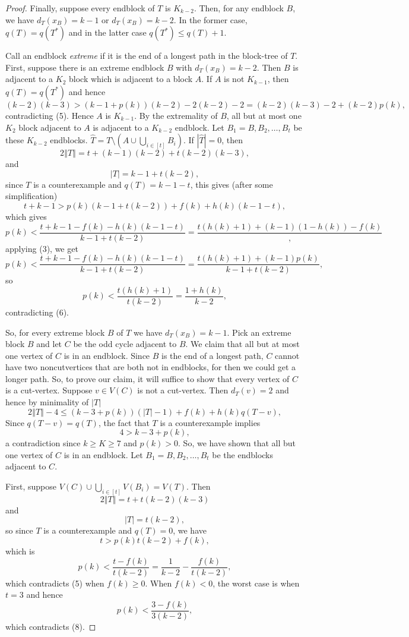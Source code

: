 \documentclass[12pt]{article}
\theoremstyle{plain}
\theoremstyle{definition}
\theoremstyle{remark}
\newcommand{\card}[1]{\left|#1\right|}
\newcommand{\size}[1]{\left\Vert#1\right\Vert}
\newcommand{\irange}[1]{\left[#1\right]}
\newcommand{\parens}[1]{\left( #1 \right)}
\begin{document}
\begin{proof}
		 Finally, suppose every endblock of $T$ is $K_{k-2}$.  Then, for any endblock $B$, we have $d_T(x_B) = k - 1$ or $d_T(x_B) = k-2$.  In the former case, $q(T) = q(T^*)$ and in the latter case $q(T^*) \le q(T) + 1$.  
		 
		 Call an endblock \emph{extreme} if it is the end of a longest path in the block-tree of $T$.  First, suppose there is an extreme endblock $B$ with $d_T(x_B) = k-2$.  Then $B$ is adjacent to a $K_2$ block which is adjacent to a block $A$.
		 If $A$ is not $K_{k-1}$, then $q(T) = q(T^*)$ and hence
		 \[(k-2)(k-3) > (k-1 + p(k))(k-2) - 2(k-2) - 2 = (k-2)(k-3) - 2 + (k-2)p(k),\]
		 contradicting (5).  Hence $A$ is $K_{k-1}$.  By the extremality of $B$, all but at most one $K_2$ block adjacent to $A$ is adjacent to a $K_{k-2}$ endblock.  Let $B_1 = B, B_2, \ldots, B_t$ be these $K_{k-2}$ endblocks.
		 $\hat{T} = T \setminus \parens{A \cup \bigcup_{i \in \irange{t}} B_i}$.  If $|\hat{T}| = 0$, then
		 \[2\size{T} = t + (k-1)(k-2) + t(k-2)(k-3),\]
		 and
		 \[\card{T} = k-1 + t(k-2),\]
		 since $T$ is a counterexample and $q(T) = k-1 - t$, this gives (after some simplification)
		 \[t + k - 1 > p(k)(k-1 + t(k-2)) + f(k) + h(k)(k-1-t),\]
		 which gives
		 \[p(k) < \frac{t+k-1 - f(k) - h(k)(k-1-t)}{k-1+t(k-2)} = \frac{t(h(k) + 1) + (k-1)(1-h(k)) - f(k)},\]
		 applying (3), we get
		 \[p(k) < \frac{t+k-1 - f(k) - h(k)(k-1-t)}{k-1+t(k-2)} = \frac{t(h(k) + 1) + (k-1)p(k)}{k-1+t(k-2)},\]
		 so
		 \[p(k) < \frac{t(h(k) + 1)}{t(k-2)} = \frac{1 + h(k)}{k-2},\]
		 contradicting (6).
		 
		  
		  So, for every extreme block $B$ of $T$ we have $d_T(x_B) = k - 1$.  Pick an extreme block $B$ and let $C$ be the odd cycle adjacent to $B$.  We claim that all but at most one vertex of $C$ is in an endblock.  Since $B$ is the end of a longest path, $C$ cannot have two noncutvertices that are both not in endblocks, for then we could get a longer path.  So, to prove our claim, it will suffice to show that every vertex of $C$ is a cut-vertex.  Suppose $v \in V(C)$ is not a cut-vertex.  Then $d_T(v) = 2$ and hence by minimality of $\card{T}$
		 \[2\size{T} - 4 \le (k-3 + p(k))\parens{\card{T} - 1} + f(k) + h(k)q(T - v),\]
		 Since $q(T-v) = q(T)$, the fact that $T$ is a counterexample implies
		 \[4 > k-3 + p(k),\]
		 a contradiction since $k \ge K \ge 7$ and $p(k) > 0$.  So, we have shown that all but one vertex of $C$ is in an endblock.  Let $B_1 = B, B_2, \ldots, B_t$ be the endblocks adjacent to $C$.  
		 
		 First, suppose $V(C) \cup \bigcup_{i \in \irange{t}} V(B_i) = V(T)$.  Then
		 \[2\size{T} = t + t(k-2)(k-3)\]
		 and
		 \[\card{T} = t(k-2),\]
		 so since $T$ is a counterexample and $q(T) = 0$, we have 
		 \[t > p(k)t(k-2) + f(k),\]
		 which is
		 \[p(k) < \frac{t - f(k)}{t(k-2)} = \frac{1}{k-2} - \frac{f(k)}{t(k-2)},\]
		 which contradicts (5) when $f(k) \ge 0$.  When $f(k) < 0$, the worst case is when $t = 3$ and hence
		 \[p(k) < \frac{3 - f(k)}{3(k-2)},\]
		 which contradicts (8).
		 

\end{proof}
\end{document}

